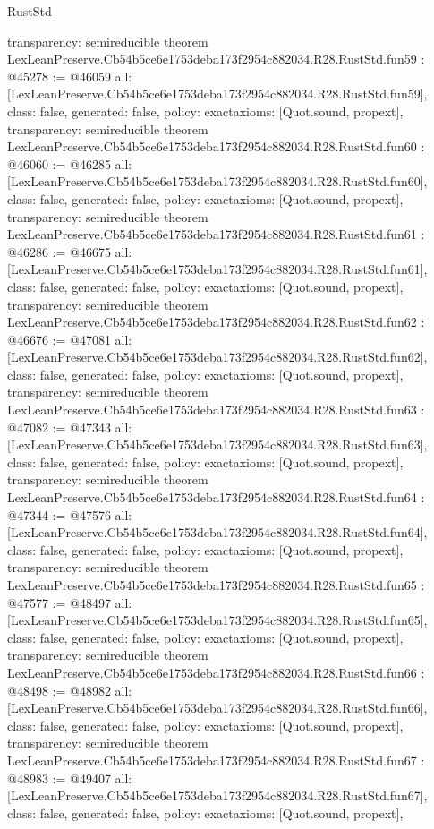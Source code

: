 \begin{lexlean}{RustStd}
\begin{coremodule}
{  transparency: semireducible
}
theorem LexLeanPreserve.Cb54b5ce6e1753deba173f2954c882034.R28.RustStd.fun59 : @45278 := @46059 {
  all: [LexLeanPreserve.Cb54b5ce6e1753deba173f2954c882034.R28.RustStd.fun59],
  class: false,
  generated: false,
  policy: exact{axioms: [Quot.sound, propext]},
  transparency: semireducible
}
theorem LexLeanPreserve.Cb54b5ce6e1753deba173f2954c882034.R28.RustStd.fun60 : @46060 := @46285 {
  all: [LexLeanPreserve.Cb54b5ce6e1753deba173f2954c882034.R28.RustStd.fun60],
  class: false,
  generated: false,
  policy: exact{axioms: [Quot.sound, propext]},
  transparency: semireducible
}
theorem LexLeanPreserve.Cb54b5ce6e1753deba173f2954c882034.R28.RustStd.fun61 : @46286 := @46675 {
  all: [LexLeanPreserve.Cb54b5ce6e1753deba173f2954c882034.R28.RustStd.fun61],
  class: false,
  generated: false,
  policy: exact{axioms: [Quot.sound, propext]},
  transparency: semireducible
}
theorem LexLeanPreserve.Cb54b5ce6e1753deba173f2954c882034.R28.RustStd.fun62 : @46676 := @47081 {
  all: [LexLeanPreserve.Cb54b5ce6e1753deba173f2954c882034.R28.RustStd.fun62],
  class: false,
  generated: false,
  policy: exact{axioms: [Quot.sound, propext]},
  transparency: semireducible
}
theorem LexLeanPreserve.Cb54b5ce6e1753deba173f2954c882034.R28.RustStd.fun63 : @47082 := @47343 {
  all: [LexLeanPreserve.Cb54b5ce6e1753deba173f2954c882034.R28.RustStd.fun63],
  class: false,
  generated: false,
  policy: exact{axioms: [Quot.sound, propext]},
  transparency: semireducible
}
theorem LexLeanPreserve.Cb54b5ce6e1753deba173f2954c882034.R28.RustStd.fun64 : @47344 := @47576 {
  all: [LexLeanPreserve.Cb54b5ce6e1753deba173f2954c882034.R28.RustStd.fun64],
  class: false,
  generated: false,
  policy: exact{axioms: [Quot.sound, propext]},
  transparency: semireducible
}
theorem LexLeanPreserve.Cb54b5ce6e1753deba173f2954c882034.R28.RustStd.fun65 : @47577 := @48497 {
  all: [LexLeanPreserve.Cb54b5ce6e1753deba173f2954c882034.R28.RustStd.fun65],
  class: false,
  generated: false,
  policy: exact{axioms: [Quot.sound, propext]},
  transparency: semireducible
}
theorem LexLeanPreserve.Cb54b5ce6e1753deba173f2954c882034.R28.RustStd.fun66 : @48498 := @48982 {
  all: [LexLeanPreserve.Cb54b5ce6e1753deba173f2954c882034.R28.RustStd.fun66],
  class: false,
  generated: false,
  policy: exact{axioms: [Quot.sound, propext]},
  transparency: semireducible
}
theorem LexLeanPreserve.Cb54b5ce6e1753deba173f2954c882034.R28.RustStd.fun67 : @48983 := @49407 {
  all: [LexLeanPreserve.Cb54b5ce6e1753deba173f2954c882034.R28.RustStd.fun67],
  class: false,
  generated: false,
  policy: exact{axioms: [Quot.sound, propext]},
}
\end{coremodule}
\end{lexlean}
